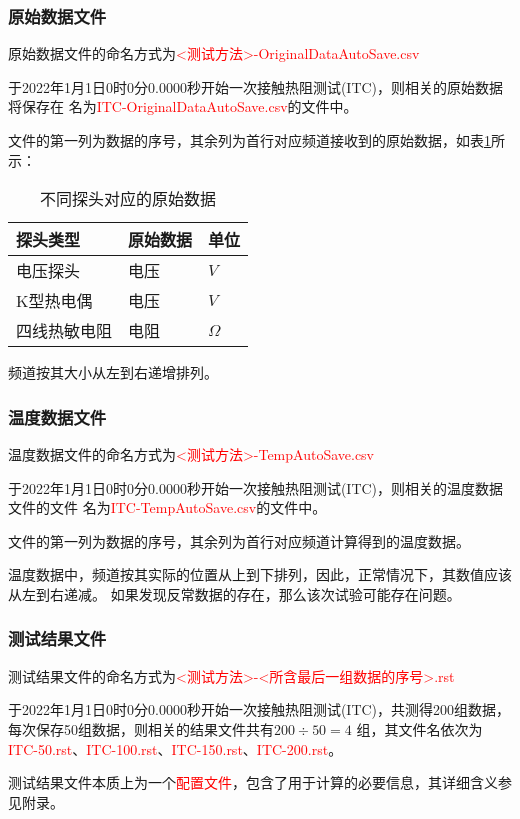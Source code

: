 \subsubsection*{原始数据文件}
原始数据文件的命名方式为\textcolor{red}{<测试方法>-OriginalDataAutoSave.csv}
\begin{example}
    于2022年1月1日0时0分0.0000秒开始一次接触热阻测试(ITC)，则相关的原始数据将保存在
    名为\textcolor{red}{ITC-OriginalDataAutoSave.csv}的文件中。
\end{example}
文件的第一列为数据的序号，其余列为首行对应频道接收到的原始数据，如表\ref{tab:originalData}所示：
\begin{table}[htbp]
    \centering
    \caption{ 不同探头对应的原始数据 \label{tab:originalData}}
    \begin{tabular}{@{}lll@{}}
        \toprule
        探头类型     & 原始数据 & 单位        \\ \midrule
        电压探头     & 电压     & $V $        \\
        K型热电偶    & 电压     & $V$         \\
        四线热敏电阻 & 电阻     & $\varOmega$ \\ \bottomrule
    \end{tabular}
\end{table}
频道按其大小从左到右递增排列。

\subsubsection*{温度数据文件}
温度数据文件的命名方式为\textcolor{red}{<测试方法>-TempAutoSave.csv}
\begin{example}
    于2022年1月1日0时0分0.0000秒开始一次接触热阻测试(ITC)，则相关的温度数据文件的文件
    名为\textcolor{red}{ITC-TempAutoSave.csv}的文件中。
\end{example}
文件的第一列为数据的序号，其余列为首行对应频道计算得到的温度数据。
\begin{note}
    温度数据中，频道按其实际的位置从上到下排列，因此，正常情况下，其数值应该从左到右递减。
    如果发现反常数据的存在，那么该次试验可能存在问题。
\end{note}

\subsubsection*{测试结果文件}
测试结果文件的命名方式为\textcolor{red}{<测试方法>-<所含最后一组数据的序号>.rst}
\begin{example}
    于2022年1月1日0时0分0.0000秒开始一次接触热阻测试(ITC)，共测得200组数据，每次保存50组数据，则相关的结果文件共有$200\div 50 = 4$
    组，其文件名依次为\textcolor{red}{ITC-50.rst}、\textcolor{red}{ITC-100.rst}、\textcolor{red}{ITC-150.rst}、\textcolor{red}{ITC-200.rst}。
\end{example}
测试结果文件本质上为一个\textcolor{red}{配置文件}，包含了用于计算的必要信息，其详细含义参见附录。

